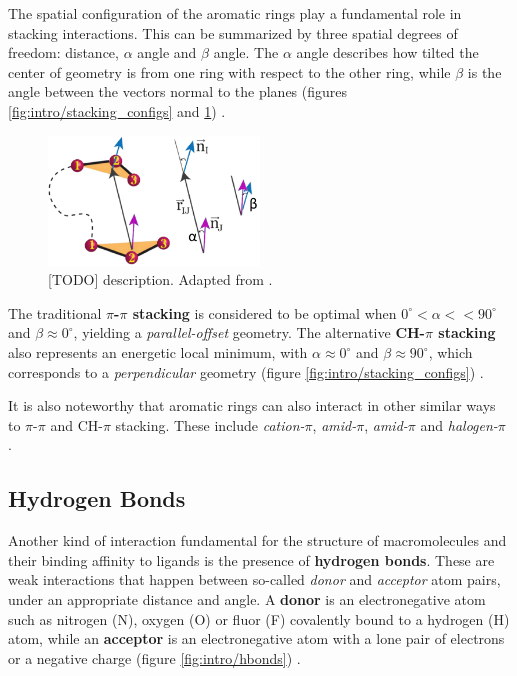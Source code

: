     The spatial configuration of the aromatic rings play a fundamental role in stacking interactions. This can be summarized by three spatial degrees of freedom: distance, $\alpha$ angle and $\beta$ angle. The $\alpha$ angle describes how tilted the center of geometry is from one ring with respect to the other ring, while $\beta$ is the angle between the vectors normal to the planes (figures \ref{fig:intro/stacking_configs} and \ref{fig:intro/stacking_angles}) \cite{stacking_general_2020, rna_2015, aromatic_2018}.

    \begin{figure}[H]
      \centering
      \includegraphics[width=0.5\textwidth]{figures/intro/stacking_angles.png}
      \caption{\label{fig:intro/stacking_angles} [TODO] description. Adapted from \cite{rna_2015}.}
    \end{figure}

    The traditional \textbf{$\pi$-$\pi$ stacking} is considered to be optimal when $0^{\circ} < \alpha << 90^{\circ}$ and $\beta \approx 0^{\circ}$, yielding a \textit{parallel-offset} geometry. The alternative \textbf{CH-$\pi$ stacking} also represents an energetic local minimum, with $\alpha \approx 0^{\circ}$ and $\beta \approx 90^{\circ}$, which corresponds to a \textit{perpendicular} geometry (figure \ref{fig:intro/stacking_configs}) \cite{stacking_general_2020}.

    It is also noteworthy that aromatic rings can also interact in other similar ways to $\pi$-$\pi$ and CH-$\pi$ stacking. These include \textit{cation-$\pi$}, \textit{amid-$\pi$}, \textit{amid-$\pi$} and \textit{halogen-$\pi$} \cite{stacking_binding_2020, electrostatics_2020}.

  \subsection{Hydrogen Bonds}
    Another kind of interaction fundamental for the structure of macromolecules and their binding affinity to ligands is the presence of \textbf{hydrogen bonds}. These are weak interactions that happen between so-called \textit{donor} and \textit{acceptor} atom pairs, under an appropriate distance and angle. A \textbf{donor} is an electronegative atom such as nitrogen (N), oxygen (O) or fluor (F) covalently bound to a hydrogen (H) atom, while an \textbf{acceptor} is an electronegative atom with a lone pair of electrons or a negative charge (figure \ref{fig:intro/hbonds}) \cite{hbonds_2023}.

